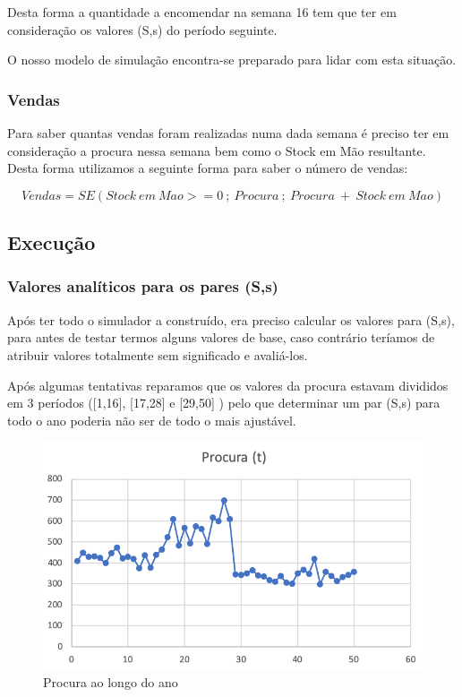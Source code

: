 \documentclass[a4paper]{article}
\begin{document}
Desta forma a quantidade a encomendar na semana 16 tem que ter em consideração os valores (S,s) do período seguinte.

O nosso modelo de simulação encontra-se preparado para lidar com esta situação.
 
 
\subsubsection{Vendas}

Para saber quantas vendas foram realizadas numa dada semana é preciso ter em consideração a procura nessa semana bem como o Stock em Mão resultante. Desta forma utilizamos a seguinte forma para saber o número de vendas: 

 $$ Vendas = SE(Stock\ em\ Mao >= 0\ ;\ Procura\ ;\ Procura\ +\ Stock\ em\ Mao) $$


\subsection{Execução}


\subsubsection{Valores analíticos para os pares (S,s)}

Após ter todo o simulador a construído, era preciso calcular os valores para (S,s), para antes de testar termos alguns valores de base, caso contrário teríamos de atribuir valores totalmente sem significado e avaliá-los. 

Após algumas tentativas reparamos que os valores da procura estavam divididos em 3 períodos ([1,16], [17,28] e [29,50] ) pelo que determinar um par (S,s) para todo o ano poderia não ser de todo o mais ajustável.

\begin{figure}[H]
\centering
\includegraphics[scale=0.7]{grafico_procura.png}
\caption{Procura ao longo do ano}
\label{img:grafico_procura}
\end{figure}
\end{document}
